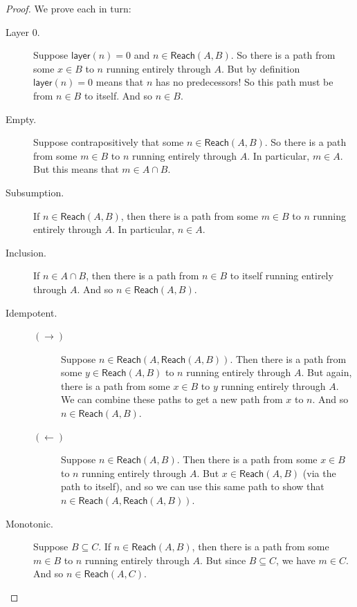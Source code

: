 \documentclass[letterpaper]{article}
\theoremstyle{definition}
\newcommand{\layer}[1]{\mathsf{layer}(#1)}
\newcommand{\Reach}{\textsf{Reach}}
\begin{document}
\begin{proof}
    We prove each in turn:
    \begin{description}
        \item[Layer $0$.] Suppose $\layer{n} = 0$ and $n \in \Reach(A, B)$.  So there is a path from some $x \in B$ to $n$ running entirely through $A$.  But by definition $\layer{n} = 0$ means that $n$ has no predecessors!  So this path must be from $n \in B$ to itself.  And so $n \in B$.
        
        \item[Empty.] Suppose contrapositively that some $n \in \Reach(A, B)$.  So there is a path from some $m \in B$ to $n$ running entirely through $A$.  In particular, $m \in A$.  But this means that $m \in A \cap B$.
        
        \item[Subsumption.] If $n \in \Reach(A, B)$, then there is a path from some $m \in B$ to $n$ running entirely through $A$.  In particular, $n \in A$.
        
        \item[Inclusion.] If $n \in A \cap B$, then there is a path from $n \in B$ to itself running entirely through $A$.  And so $n \in \Reach(A, B)$.
        
        \item[Idempotent.]\:
        \begin{description}
            \item[$(\rightarrow)$] Suppose $n \in \Reach(A, \Reach(A, B))$.  Then there is a path from some $y \in \Reach(A, B)$ to $n$ running entirely through $A$.  But again, there is a path from some $x \in B$ to $y$ running entirely through $A$.  We can combine these paths to get a new path from $x$ to $n$.  And so $n \in \Reach(A, B)$.
            
            \item[$(\leftarrow)$] Suppose $n \in \Reach(A, B)$.  Then there is a path from some $x \in B$ to $n$ running entirely through $A$.  But $x \in \Reach(A, B)$ (via the path to itself), and so we can use this same path to show that $n \in \Reach(A, \Reach(A, B))$.
        \end{description}
        
        \item[Monotonic.] Suppose $B \subseteq C$. If $n \in \Reach(A, B)$, then there is a path from some $m \in B$ to $n$ running entirely through $A$.  But since $B \subseteq C$, we have $m \in C$.  And so $n \in \Reach(A, C)$.


\end{description}
\end{proof}
\end{document}
